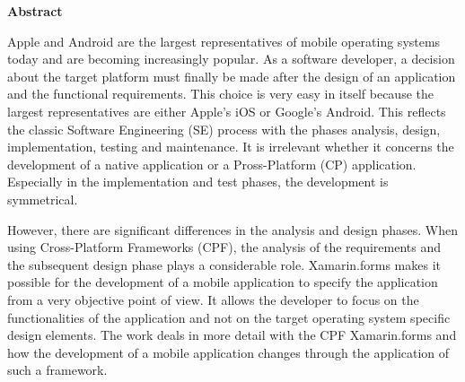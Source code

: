 
\begin{center}
{\Large\bfseries Abstract}
\end{center}

Apple and Android are the largest representatives of mobile operating systems today and are becoming increasingly popular. As a software developer, a decision about the target platform must finally be made after the design of an application and the functional requirements. This choice is very easy in itself because the largest representatives are either Apple's iOS or Google's Android. This reflects the classic Software Engineering (SE) process with the phases analysis, design, implementation, testing and maintenance. It is irrelevant whether it concerns the development of a native application or a Pross-Platform (CP) application. Especially in the implementation and test phases, the development is symmetrical.

However, there are significant differences in the analysis and design phases. When using Cross-Platform Frameworks (CPF), the analysis of the requirements and the subsequent design phase plays a considerable role. Xamarin.forms makes it possible for the development of a mobile application to specify the application from a very objective point of view. It allows the developer to focus on the functionalities of the application and not on the target operating system specific design elements. The work deals in more detail with the CPF Xamarin.forms and how the development of a mobile application changes through the application of such a framework.

